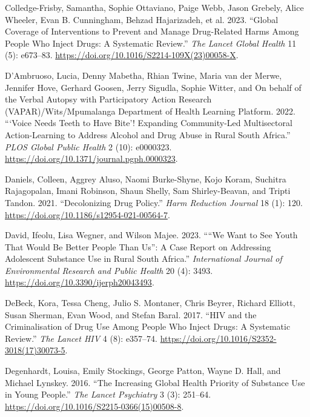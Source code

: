 \documentclass[
  letterpaper,
  DIV=11,
  numbers=noendperiod]{scrartcl}
\newlength{\cslhangindent}
\newenvironment{CSLReferences}[2] %
 {\begin{list}{}{%
  \setlength{\itemindent}{0pt}
  \setlength{\leftmargin}{0pt}
  \setlength{\parsep}{0pt}
  \ifodd #1
   \setlength{\leftmargin}{\cslhangindent}
   \setlength{\itemindent}{-1\cslhangindent}
  \fi
  \setlength{\itemsep}{#2\baselineskip}}}
 {\end{list}}
\begin{document}
\begin{CSLReferences}{1}{0}
Colledge-Frisby, Samantha, Sophie Ottaviano, Paige Webb, Jason Grebely,
Alice Wheeler, Evan B. Cunningham, Behzad Hajarizadeh, et al. 2023.
{``Global Coverage of Interventions to Prevent and Manage Drug-Related
Harms Among People Who Inject Drugs: A Systematic Review.''} \emph{The
Lancet Global Health} 11 (5): e673--83.
\url{https://doi.org/10.1016/S2214-109X(23)00058-X}.

D'Ambruoso, Lucia, Denny Mabetha, Rhian Twine, Maria van der Merwe,
Jennifer Hove, Gerhard Goosen, Jerry Sigudla, Sophie Witter, and On
behalf of the Verbal Autopsy with Participatory Action Research
(VAPAR)/Wits/Mpumalanga Department of Health Learning Platform. 2022.
{``{`}Voice Needs Teeth to Have Bite{'}! Expanding Community-Led
Multisectoral Action-Learning to Address Alcohol and Drug Abuse in Rural
South Africa.''} \emph{PLOS Global Public Health} 2 (10): e0000323.
\url{https://doi.org/10.1371/journal.pgph.0000323}.

Daniels, Colleen, Aggrey Aluso, Naomi Burke-Shyne, Kojo Koram, Suchitra
Rajagopalan, Imani Robinson, Shaun Shelly, Sam Shirley-Beavan, and
Tripti Tandon. 2021. {``Decolonizing Drug Policy.''} \emph{Harm
Reduction Journal} 18 (1): 120.
\url{https://doi.org/10.1186/s12954-021-00564-7}.

David, Ifeolu, Lisa Wegner, and Wilson Majee. 2023. {``{``}We Want to
See Youth That Would Be Better People Than Us{''}: A Case Report on
Addressing Adolescent Substance Use in Rural South Africa.''}
\emph{International Journal of Environmental Research and Public Health}
20 (4): 3493. \url{https://doi.org/10.3390/ijerph20043493}.

DeBeck, Kora, Tessa Cheng, Julio S. Montaner, Chris Beyrer, Richard
Elliott, Susan Sherman, Evan Wood, and Stefan Baral. 2017. {``HIV and
the Criminalisation of Drug Use Among People Who Inject Drugs: A
Systematic Review.''} \emph{The Lancet HIV} 4 (8): e357--74.
\url{https://doi.org/10.1016/S2352-3018(17)30073-5}.

Degenhardt, Louisa, Emily Stockings, George Patton, Wayne D. Hall, and
Michael Lynskey. 2016. {``The Increasing Global Health Priority of
Substance Use in Young People.''} \emph{The Lancet Psychiatry} 3 (3):
251--64. \url{https://doi.org/10.1016/S2215-0366(15)00508-8}.


\end{CSLReferences}
\end{document}
